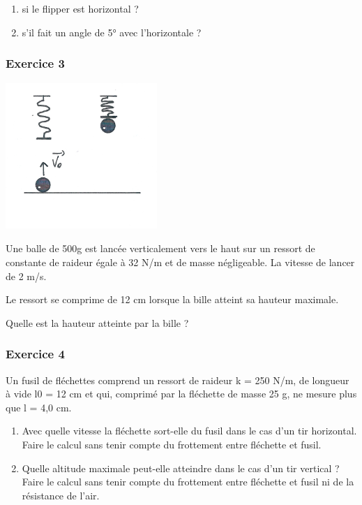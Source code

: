 \begin{multicols}{2}
\begin{enumerate}
\item si le flipper est horizontal ? 
\item s’il fait un angle de 5° avec l’horizontale ?
\end{enumerate}

\subsubsection*[Exercice 3]{Exercice 3}
\begin{center}
\begin{minipage}{6.276cm}
 \includegraphics[width=5.75cm,height=5.539cm]{COURS2EnergieOHEXERCRESOL-img/COURS2EnergieOHEXERCRESOL-img004.png} 
\end{minipage}
\end{center}
Une balle de 500g est lancée verticalement vers le haut sur un ressort de constante de raideur égale à 32 N/m et de
masse négligeable. La vitesse de lancer de 2 m/s.

Le ressort se comprime de 12 cm lorsque la bille atteint sa hauteur maximale.

Quelle est la hauteur atteinte par la bille ? 

\subsubsection*{Exercice 4}
Un fusil de fléchettes comprend un ressort de raideur k = 250 N/m, de longueur à vide l0 = 12 cm et qui, comprimé par la
fléchette de masse 25 g, ne mesure plus que l = 4,0 cm.

\begin{enumerate}
\item Avec quelle vitesse la fléchette sort-elle du fusil dans le cas d’un tir horizontal. Faire le calcul sans tenir
compte du frottement entre fléchette et fusil.
\item Quelle altitude maximale peut-elle atteindre dans le cas d’un tir vertical ? Faire le calcul sans tenir compte du
frottement entre fléchette et fusil ni de la résistance de l’air.
\end{enumerate}


\end{multicols}
